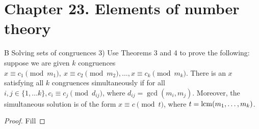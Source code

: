 \section*{Chapter 23. Elements of number theory}


\begin{exercise}{B Solving sets of congruences}
3) Use Theorems 3 and 4 to prove the following: suppose we are given $k$ congruences $x\equiv c_{1}\pmod{m_{1}},\ x\equiv c_{2}\pmod{m_{2}},\dots,x\equiv c_{k}\pmod{m_{k}}$. There is an $x$ satisfying all $k$ congruences simultaneously if for all $i,j\in \{1,\dots k\}, c_{i}\equiv c_{j}\pmod{d_{ij}}$, where $d_{ij}=\gcd(m_{i},m_{j})$. Moreover, the simultaneous solution is of the form $x\equiv c\pmod{t}$, where $t=\operatorname*{lcm}(m_{1},\dots,m_{k})$.
\end{exercise}
\begin{proof}
 Fill
\end{proof}



